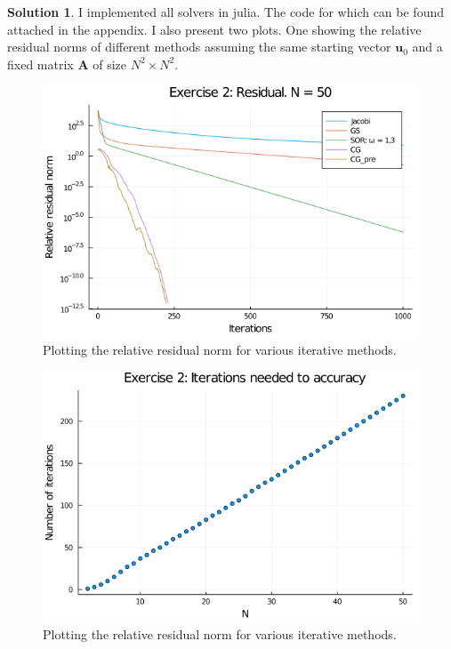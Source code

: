 \documentclass[12pt]{article}
\renewcommand{\vec}[1]{\mathbf{#1}}
\theoremstyle{definition}
\newtheorem{sol}{Solution}
\theoremstyle{remark}
\begin{document}
\begin{sol}
    I implemented all solvers in julia. The code for which can be found attached in the appendix. I also present two plots. One showing the relative residual norms of different methods assuming the same starting vector $\vec{u}_{0}$ and a fixed matrix $\vec{A}$ of size $N^2 \times N^2$.


    \begin{figure}[h]
        \centering
        \includegraphics[width=0.8\linewidth]{figs/hw-5-exer-2-residual.png}
        \caption{Plotting the relative residual norm for various iterative methods.}%
        \label{fig:E2-res}
    \end{figure}

    \begin{figure}[h]
        \centering
        \includegraphics[width=0.8\linewidth]{figs/hw-5-exer-2-iterations-needed.png}
        \caption{Plotting the relative residual norm for various iterative methods.}%
        \label{fig:E2-iter}
    \end{figure}

\end{sol}
\end{document}
